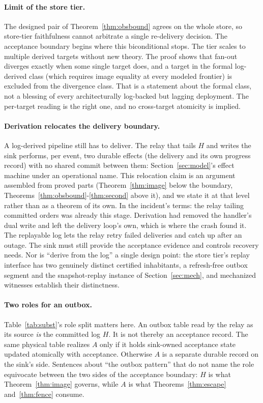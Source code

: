 \documentclass[sigplan,10pt]{acmart}
\theoremstyle{plain}
\theoremstyle{definition}
\begin{document}
\paragraph{Limit of the store tier.}
The designed pair of Theorem~\ref{thm:obsbound} agrees on the whole
store, so store-tier faithfulness cannot arbitrate a single
re-delivery decision. The acceptance boundary begins where this
biconditional stops. The tier scales to multiple derived targets
without new theory. The proof shows that fan-out diverges
exactly when some single target does, and a target in the formal
log-derived class (which requires image equality at every modeled
frontier) is excluded from the divergence class. That is a statement
about the formal class, not a blessing of every architecturally
log-backed but lagging deployment. The per-target reading is the right
one, and no cross-target atomicity is implied.

\paragraph{Derivation relocates the delivery boundary.}
A log-derived pipeline still has to deliver. The relay that tails $H$
and writes the sink performs, per event, two durable effects (the
delivery and its own progress record) with no shared commit between
them: Section~\ref{sec:model}'s effect machine under an operational
name. This relocation claim is an argument assembled from proved
parts (Theorem~\ref{thm:image} below the boundary,
Theorems~\ref{thm:obsbound}-\ref{thm:second} above it), and we state
it at that level rather than as a theorem of its own. In the
incident's terms: the relay tailing committed orders was already this
stage. Derivation had removed the handler's dual write and left the
delivery loop's own, which is where the crash found it. The replayable log lets
the relay retry failed deliveries and catch up after an outage. The sink
must still provide the acceptance evidence and controls recovery needs. Nor is
``derive from the log'' a single
design point: the store tier's replay interface has two genuinely
distinct certified inhabitants, a refresh-free outbox segment and the
snapshot-replay instance of Section~\ref{sec:mech}, and mechanized
witnesses establish their distinctness.

\paragraph{Two roles for an outbox.}
Table~\ref{tab:subst}'s role split matters here. An outbox
table read by the relay as its source \emph{is} the committed log $H$.
It is not thereby an acceptance record. The same physical table
realizes $A$ only if it holds sink-owned acceptance state updated
atomically with acceptance. Otherwise $A$ is a separate durable
record on the sink's side. Sentences about ``the outbox pattern''
that do not name the role equivocate between the two sides of the
acceptance boundary: $H$ is what Theorem~\ref{thm:image} governs,
while $A$ is what Theorems~\ref{thm:escape} and~\ref{thm:fence}
consume.
\end{document}
